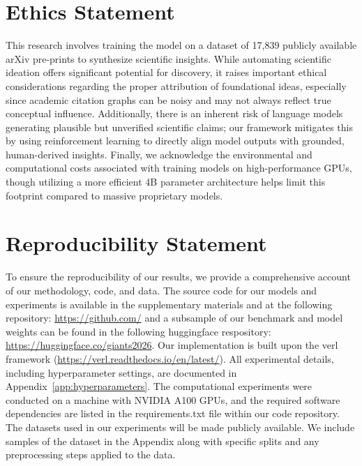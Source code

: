 \vspace{-0.15cm}
\section{Ethics Statement}
\vspace{-0.15cm}
This research involves training the \ourmethod{} model on a dataset of 17,839 publicly available arXiv pre-prints to synthesize scientific insights. While automating scientific ideation offers significant potential for discovery, it raises important ethical considerations regarding the proper attribution of foundational ideas, especially since academic citation graphs can be noisy and may not always reflect true conceptual influence. Additionally, there is an inherent risk of language models generating plausible but unverified scientific claims; our framework mitigates this by using reinforcement learning to directly align model outputs with grounded, human-derived insights. Finally, we acknowledge the environmental and computational costs associated with training models on high-performance GPUs, though utilizing a more efficient 4B parameter architecture helps limit this footprint compared to massive proprietary models.


\vspace{-0.15cm}
\section{Reproducibility Statement}
\vspace{-0.15cm}
To ensure the reproducibility of our results, we provide a comprehensive account of our methodology, code, and data. The source code for our models and experiments is available in the supplementary materials and at the following repository: \url{https://github.com/} and a subsample of our benchmark and model weights can be found in the following huggingface respository: \url{https://huggingface.co/giants2026}. Our implementation is built upon the verl framework (\url{https://verl.readthedocs.io/en/latest/}). All experimental details, including hyperparameter settings, are documented in Appendix~\ref{app:hyperparameters}. The computational experiments were conducted on a machine with NVIDIA A100 GPUs, and the required software dependencies are listed in the requirements.txt file within our code repository. The datasets used in our experiments will be made publicly available. We include samples of the dataset in the Appendix along with specific splits and any preprocessing steps applied to the data.